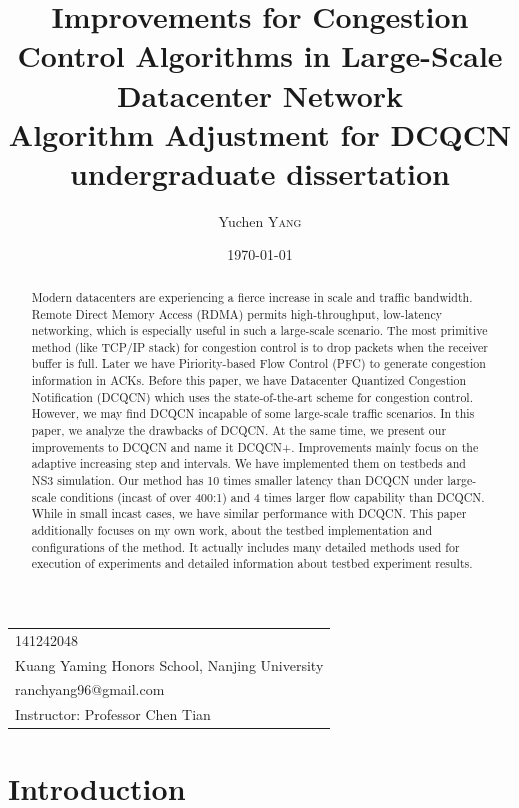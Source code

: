 \documentclass[12pt,a4paper]{article}
\title{Improvements for Congestion Control Algorithms in Large-Scale Datacenter Network \\ Algorithm Adjustment for DCQCN \\ undergraduate dissertation} %
\author{Yuchen \textsc{Yang}} %
\date{\today} %
\begin{document}
\maketitle %

\begin{center}
\begin{tabular}{l}
141242048 \\
Kuang Yaming Honors School, Nanjing University \\
ranchyang96@gmail.com \\
Instructor: Professor Chen Tian
\end{tabular}
\end{center}


\begin{abstract}
	Modern datacenters are experiencing a fierce increase in scale and traffic bandwidth.
	Remote Direct Memory Access (RDMA) permits high-throughput, low-latency networking,
	which is especially useful in such a large-scale scenario.
	The most primitive method (like TCP/IP stack) for congestion control is to drop packets when the receiver buffer is full.
	Later we have Piriority-based Flow Control (PFC) to generate congestion information in ACKs.
	Before this paper, we have Datacenter Quantized Congestion Notification (DCQCN) which uses the state-of-the-art scheme for congestion control.
	However, we may find DCQCN incapable of some large-scale traffic scenarios.
	In this paper, we analyze the drawbacks of DCQCN.
	At the same time, we present our improvements to DCQCN and name it DCQCN+.
	Improvements mainly focus on the adaptive increasing step and intervals.
	We have implemented them on testbeds and NS3 simulation.
	Our method has 10 times smaller latency than DCQCN under large-scale conditions (incast of over 400:1) and 4 times larger flow capability than DCQCN.
	While in small incast cases, we have similar performance with DCQCN.
	This paper additionally focuses on my own work, about the testbed implementation and configurations of the method.
	It actually includes many detailed methods used for execution of experiments and detailed information about testbed experiment results.
\end{abstract}

\tableofcontents

\section{Introduction}
\end{document}
